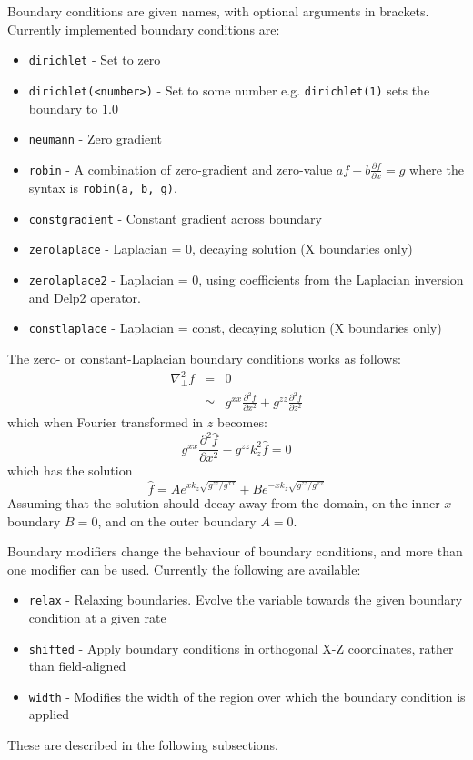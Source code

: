\documentclass[12pt]{article}
\newcommand{\code}[1]{\texttt{#1}}
\newcommand{\deriv}[2]{\ensuremath{\frac{\partial #1}{\partial #2}}}
\begin{document}
Boundary conditions are given names, with optional arguments in brackets.
Currently implemented boundary conditions are:
\begin{itemize}
\item \code{dirichlet} - Set to zero
\item \code{dirichlet(<number>)} - Set to some number e.g. \code{dirichlet(1)}
sets the boundary to $1.0$
\item \code{neumann} - Zero gradient
\item \code{robin} - A combination of zero-gradient and zero-value $a f + b\deriv{f}{x} = g$
  where the syntax is \code{robin(a, b, g)}.
\item \code{constgradient} - Constant gradient across boundary

\item \code{zerolaplace} - Laplacian = 0, decaying solution (X boundaries only)
\item \code{zerolaplace2} - Laplacian = 0, using coefficients from the Laplacian inversion
  and Delp2 operator.
\item \code{constlaplace} - Laplacian = const, decaying solution (X boundaries only)
\end{itemize}
The zero- or constant-Laplacian boundary conditions works as follows:
\begin{eqnarray*}
\nabla_\perp^2 f &=& 0 \\
&\simeq& g^{xx}\frac{\partial^2 f}{\partial x^2} + g^{zz}\frac{\partial^2 f}{\partial z^2}
\end{eqnarray*}
which when Fourier transformed in $z$ becomes:
\[
g^{xx}\frac{\partial^2 \hat{f}}{\partial x^2} - g^{zz}k_z^2 \hat{f} = 0
\]
which has the solution
\[
\hat{f} = Ae^{xk_z\sqrt{g^{zz}/g^{xx}}} + Be^{-xk_z\sqrt{g^{zz}/g^{xx}}}
\]
Assuming that the solution should decay away from the domain, on the inner
$x$ boundary $B = 0$, and on the outer boundary $A = 0$.

Boundary modifiers change the behaviour of boundary conditions, and more than
one modifier
can be used. Currently the following are available:
\begin{itemize}
\item \code{relax} - Relaxing boundaries. Evolve the variable towards the given boundary condition at
  a given rate
\item \code{shifted} - Apply boundary conditions in orthogonal X-Z coordinates, rather than
  field-aligned
\item \code{width} - Modifies the width of the region over which the boundary condition is applied
\end{itemize}
These are described in the following subsections.
\end{document}
